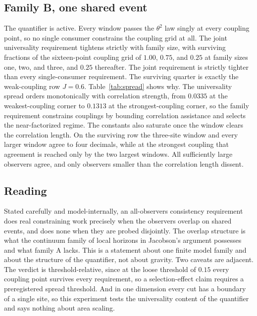 \documentclass[aps,prd,reprint,nofootinbib,longbibliography]{revtex4-2}
\begin{document}
\subsection{Family B, one shared event}

The quantifier is active.  Every window passes the $\theta^{2}$ law singly
at every coupling point, so no single consumer constrains the coupling
grid at all.  The joint universality requirement tightens strictly with
family size, with surviving fractions of the sixteen-point coupling grid
of $1.00$, $0.75$, and $0.25$ at family sizes one, two, and three, and
$0.25$ thereafter.  The joint requirement is strictly tighter than every
single-consumer requirement.  The surviving quarter is exactly the
weak-coupling row $J=0.6$.  Table~\ref{tab:spread} shows why.  The
universality spread orders monotonically with correlation strength, from
$0.0335$ at the weakest-coupling corner to $0.1313$ at the
strongest-coupling corner, so the family requirement constrains couplings
by bounding correlation assistance and selects the near-factorized regime.
The constants also saturate once the window clears the correlation
length.  On the surviving row the three-site window and every larger
window agree to four decimals, while at the strongest coupling that
agreement is reached only by the two largest windows.  All sufficiently
large observers agree, and only observers smaller than the correlation
length dissent.

\subsection{Reading}

Stated carefully and model-internally, an all-observers consistency
requirement does real constraining work precisely when the observers
overlap on shared events, and does none when they are probed disjointly.
The overlap structure is what the continuum family of local horizons in
Jacobson's argument possesses and what family A lacks.  This is a
statement about one finite model family and about the structure of the
quantifier, not about gravity.  Two caveats are adjacent.  The verdict is
threshold-relative, since at the loose threshold of $0.15$ every coupling
point survives every requirement, so a selection-effect claim requires a
preregistered spread threshold.  And in one dimension every cut has a
boundary of a single site, so this experiment tests the universality
content of the quantifier and says nothing about area scaling.
\end{document}
